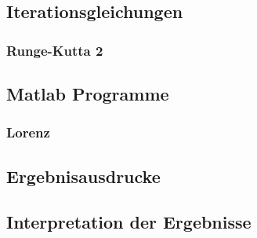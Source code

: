 \documentclass[10pt]{scrartcl}
\begin{document}
	\subsection{Iterationsgleichungen}
		\subsubsection{Runge-Kutta 2}

	\subsection{Matlab Programme}
		\subsubsection{Lorenz}			

	\subsection{Ergebnisausdrucke}	
		
	\subsection{Interpretation der Ergebnisse}				
\end{document}
